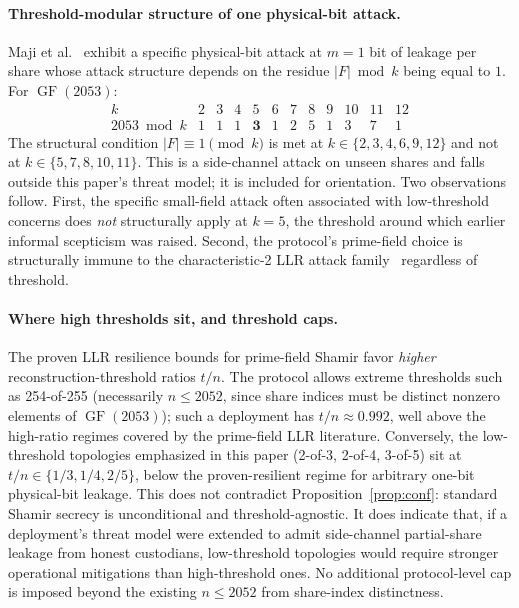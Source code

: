 \documentclass[11pt]{article}
\newcommand{\GF}{\operatorname{GF}}
\begin{document}
\paragraph{Threshold-modular structure of one physical-bit attack.} Maji et al.~\cite{maji2021} exhibit a specific physical-bit attack at $m = 1$ bit of leakage per share whose attack structure depends on the residue $|F| \bmod k$ being equal to $1$. For $\GF(2053)$:
\[
\begin{array}{c|cccccccccccc}
k & 2 & 3 & 4 & 5 & 6 & 7 & 8 & 9 & 10 & 11 & 12 \\ \hline
2053 \bmod k & 1 & 1 & 1 & \mathbf{3} & 1 & 2 & 5 & 1 & 3 & 7 & 1
\end{array}
\]
The structural condition $|F| \equiv 1 \pmod k$ is met at $k \in \{2,3,4,6,9,12\}$ and not at $k \in \{5,7,8,10,11\}$. This is a side-channel attack on unseen shares and falls outside this paper's threat model; it is included for orientation. Two observations follow. First, the specific small-field attack often associated with low-threshold concerns does \emph{not} structurally apply at $k = 5$, the threshold around which earlier informal scepticism was raised. Second, the protocol's prime-field choice is structurally immune to the characteristic-2 LLR attack family~\cite{guruswamiwootters2016} regardless of threshold.

\paragraph{Where high thresholds sit, and threshold caps.} The proven LLR resilience bounds for prime-field Shamir favor \emph{higher} reconstruction-threshold ratios $t/n$. The protocol allows extreme thresholds such as 254-of-255 (necessarily $n \leq 2052$, since share indices must be distinct nonzero elements of $\GF(2053)$); such a deployment has $t/n \approx 0.992$, well above the high-ratio regimes covered by the prime-field LLR literature. Conversely, the low-threshold topologies emphasized in this paper (2-of-3, 2-of-4, 3-of-5) sit at $t/n \in \{1/3, 1/4, 2/5\}$, below the proven-resilient regime for arbitrary one-bit physical-bit leakage. This does not contradict Proposition~\ref{prop:conf}: standard Shamir secrecy is unconditional and threshold-agnostic. It does indicate that, if a deployment's threat model were extended to admit side-channel partial-share leakage from honest custodians, low-threshold topologies would require stronger operational mitigations than high-threshold ones. No additional protocol-level cap is imposed beyond the existing $n \leq 2052$ from share-index distinctness.
\end{document}
